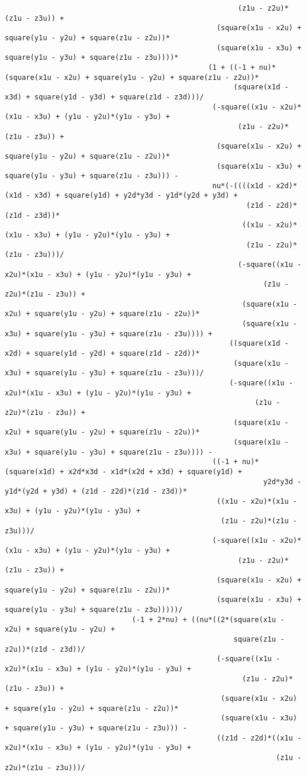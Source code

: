 \begin{lstlisting}
													   (z1u - z2u)*(z1u - z3u)) + 
												  (square(x1u - x2u) + square(y1u - y2u) + square(z1u - z2u))*
												  (square(x1u - x3u) + square(y1u - y3u) + square(z1u - z3u))))*
												(1 + ((-1 + nu)*(square(x1u - x2u) + square(y1u - y2u) + square(z1u - z2u))*
													  (square(x1d - x3d) + square(y1d - y3d) + square(z1d - z3d)))/
												 (-square((x1u - x2u)*(x1u - x3u) + (y1u - y2u)*(y1u - y3u) + 
													   (z1u - z2u)*(z1u - z3u)) + 
												  (square(x1u - x2u) + square(y1u - y2u) + square(z1u - z2u))*
												  (square(x1u - x3u) + square(y1u - y3u) + square(z1u - z3u))) - 
												 nu*(-((((x1d - x2d)*(x1d - x3d) + square(y1d) + y2d*y3d - y1d*(y2d + y3d) + 
														 (z1d - z2d)*(z1d - z3d))*
														((x1u - x2u)*(x1u - x3u) + (y1u - y2u)*(y1u - y3u) + 
														 (z1u - z2u)*(z1u - z3u)))/
													   (-square((x1u - x2u)*(x1u - x3u) + (y1u - y2u)*(y1u - y3u) + 
															 (z1u - z2u)*(z1u - z3u)) + 
														(square(x1u - x2u) + square(y1u - y2u) + square(z1u - z2u))*
														(square(x1u - x3u) + square(y1u - y3u) + square(z1u - z3u)))) + 
													 ((square(x1d - x2d) + square(y1d - y2d) + square(z1d - z2d))*
													  (square(x1u - x3u) + square(y1u - y3u) + square(z1u - z3u)))/
													 (-square((x1u - x2u)*(x1u - x3u) + (y1u - y2u)*(y1u - y3u) + 
														   (z1u - z2u)*(z1u - z3u)) + 
													  (square(x1u - x2u) + square(y1u - y2u) + square(z1u - z2u))*
													  (square(x1u - x3u) + square(y1u - y3u) + square(z1u - z3u)))) - 
												 ((-1 + nu)*(square(x1d) + x2d*x3d - x1d*(x2d + x3d) + square(y1d) + 
															 y2d*y3d - y1d*(y2d + y3d) + (z1d - z2d)*(z1d - z3d))*
												  ((x1u - x2u)*(x1u - x3u) + (y1u - y2u)*(y1u - y3u) + 
												   (z1u - z2u)*(z1u - z3u)))/
												 (-square((x1u - x2u)*(x1u - x3u) + (y1u - y2u)*(y1u - y3u) + 
													   (z1u - z2u)*(z1u - z3u)) + 
												  (square(x1u - x2u) + square(y1u - y2u) + square(z1u - z2u))*
												  (square(x1u - x3u) + square(y1u - y3u) + square(z1u - z3u)))))/
							  (-1 + 2*nu) + ((nu*((2*(square(x1u - x2u) + square(y1u - y2u) + 
													  square(z1u - z2u))*(z1d - z3d))/
												  (-square((x1u - x2u)*(x1u - x3u) + (y1u - y2u)*(y1u - y3u) + 
														(z1u - z2u)*(z1u - z3u)) + 
												   (square(x1u - x2u) + square(y1u - y2u) + square(z1u - z2u))*
												   (square(x1u - x3u) + square(y1u - y3u) + square(z1u - z3u))) - 
												  ((z1d - z2d)*((x1u - x2u)*(x1u - x3u) + (y1u - y2u)*(y1u - y3u) + 
																(z1u - z2u)*(z1u - z3u)))/

\end{lstlisting}
